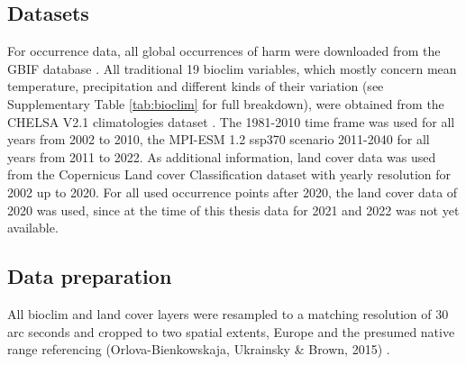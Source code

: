 \documentclass[12pt,a4paper]{article}
\begin{document}
\subsection{Datasets} \label{ssec:datasets}
For occurrence data, all global occurrences of \gls{harm} were downloaded from the GBIF database \autocite{GBIFaxyridisdataset}.
All traditional 19 bioclim variables, which mostly concern mean temperature, precipitation and different kinds of their variation (see Supplementary Table \ref{tab:bioclim} for full breakdown), were obtained from the CHELSA V2.1 climatologies dataset \autocite{karger2017CHELSApaper, CHELSAbioclimdataset}.
The 1981-2010 time frame was used for all years from 2002 to 2010, the MPI-ESM 1.2 ssp370 scenario 2011-2040 for all years from 2011 to 2022.
As additional information, land cover data was used from the Copernicus Land cover Classification dataset \autocite{COPlandcoverdataset}  with yearly resolution for 2002 up to 2020.
For all used occurrence points after 2020, the land cover data of 2020 was used, since at the time of this thesis data for 2021 and 2022 was not yet available.

\subsection{Data preparation} \label{ssec:datapreparation}
All bioclim and land cover layers were resampled to a matching resolution of 30 arc seconds and cropped to two spatial extents, Europe and the presumed native range referencing (Orlova-Bienkowskaja, Ukrainsky \& Brown, 2015) \autocite{orlova2015harmonia}. 
\end{document}
